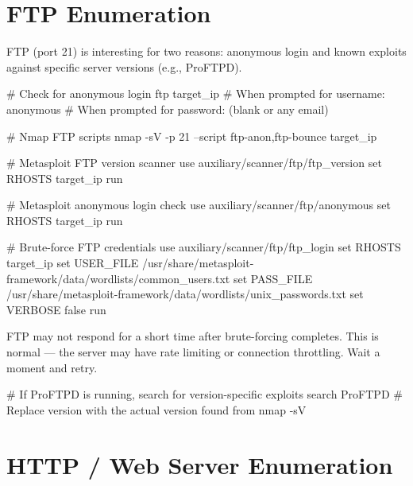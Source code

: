 \begin{notebox}


\section{FTP Enumeration}
\label{sec:ftp_enum}

FTP (port 21) is interesting for two reasons: anonymous login and known exploits
against specific server versions (e.g., ProFTPD).

\begin{termbox}
# Check for anonymous login
ftp target_ip
# When prompted for username: anonymous
# When prompted for password: (blank or any email)

# Nmap FTP scripts
nmap -sV -p 21 --script ftp-anon,ftp-bounce target_ip

# Metasploit FTP version scanner
use auxiliary/scanner/ftp/ftp_version
set RHOSTS target_ip
run

# Metasploit anonymous login check
use auxiliary/scanner/ftp/anonymous
set RHOSTS target_ip
run

# Brute-force FTP credentials
use auxiliary/scanner/ftp/ftp_login
set RHOSTS target_ip
set USER_FILE /usr/share/metasploit-framework/data/wordlists/common_users.txt
set PASS_FILE /usr/share/metasploit-framework/data/wordlists/unix_passwords.txt
set VERBOSE false
run
\end{termbox}

\begin{notebox}
FTP may not respond for a short time after brute-forcing completes. This is normal
--- the server may have rate limiting or connection throttling. Wait a moment and
retry.
\end{notebox}

\begin{termbox}
# If ProFTPD is running, search for version-specific exploits
search ProFTPD
# Replace version with the actual version found from nmap -sV
\end{termbox}

\section{HTTP / Web Server Enumeration}
\label{sec:http_enum}


\end{notebox}
